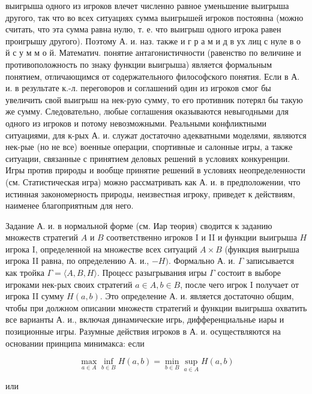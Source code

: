 \documentclass[10pt]{article}
\begin{document}
выигрыша одного из игроков влечет численно равное уменьшение выигрыша другого, так что во всех ситуациях сумма выигрышей игроков постоянна (можно считать, что эта сумма равна нулю, т. е. что выигрыш одного игрока равен проигрышу другого). Поэтому А. и. наз. также и г р а м и д в ух лиц с нуле в о й с у м м о й. Математич. понятие антагонистичности (равенство по величине и противоположность по знаку функции выигрыша) является формальным понятием, отличающимся от содержательного философского понятия. Если в А. и. в результате к.-л. переговоров и соглашений один из игроков смог бы увеличить свой выигрыш на нек-рую сумму, то его противник потерял бы такую же сумму. Следовательно, любые соглашения оказываются невыгодными для одного из игроков и потому невозможными. Реальными конфликтными ситуациями, для к-рых А. и. служат достаточно адекватными моделями, являются нек-рые (но не все) военные операции, спортивные и салонные игры, а также ситуации, связанные с принятием деловых решений в условиях конкуренции. Игры против природы и вообще принятие решений в условиях неопределенности (см. Статистическая игра) можно рассматривать как А. и. в предположении, что истинная закономерность природы, неизвестная игроку, приведет к действиям, наименее благоприятным для него.



Задание А. и. в нормальной форме (см. Иар теория) сводится к заданию множеств стратегий $A$ и $B$ соответственно игроков I и II и функции выигрыша $H$ игрока I, определенной на множестве всех ситуаций $A \times B$ (функция выигрыша игрока II равна, по определению А. и., $-H)$. Формально А. и. $\Gamma$ записывается как тройка $\Gamma=\langle A, B, H\rangle$. Процесс разыгрывания игры $\Gamma$ состоит в выборе игроками нек-рых своих стратегий $a \in A, b \in B$, после чего игрок I получает от игрока II сумму $H(a, b)$. Это определение А. и. является достаточно общим, чтобы при должном описании множеств стратегий и функции выигрыша охватить все варианты А. и., включая динамические игрь, дифференциальнье иары и позиционные игры. Разумные действия игроков в А. и. осуществляются на основании принципа минимакса: если



\[

\max _{a \in A} \inf _{b \in B} H(a, b)=\min _{b \in B} \sup _{a \in A} H(a, b)

\]



или
\end{document}
